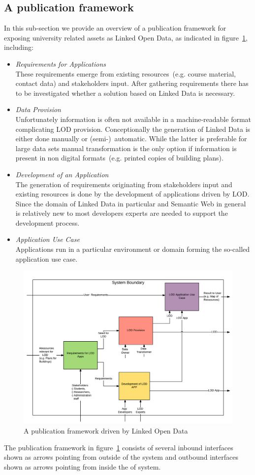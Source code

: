 \documentclass{article}
\begin{document}
\subsection{A publication framework}
\label{sec:publication_framework}
In this sub-section we provide an overview of a publication framework for exposing university related assets as Linked Open Data, as indicated in figure~\ref{fig:lod-architecture}, including:
\begin{itemize}
  \item \textit{Requirements for Applications}~\\
  These requirements emerge from existing resources~(e.g. course material, contact data) and stakeholders input. After gathering requirements there has to be investigated whether a solution based on Linked Data is necessary.
  \item \textit{Data Provision}~\\
  Unfortunately information is often not available in a machine-readable format complicating LOD provision. Conceptionally the generation of Linked Data is either done manually or (semi-)~automatic. While the latter is preferable for large data sets manual transformation is the only option if information is present in non digital formats~(e.g. printed copies of building plans).  
  \item \textit{Development of an Application}~\\
  The generation of requirements originating from stakeholders input and existing resources is done by the development of applications driven by LOD. Since the domain of Linked Data in particular and Semantic Web in general is relatively new to most developers experts are needed to support the development process. 
  \item \textit{Application Use Case}~\\
  Applications run in a particular environment or domain forming the so-called application use case. 
\end{itemize}

\begin{figure}[H]
	\centering \includegraphics*[width=.8\columnwidth]{lod_architecture.png}
	\caption{A publication framework driven by Linked Open Data}
	\label{fig:lod-architecture}
\end{figure}
The publication framework in figure~\ref{fig:lod-architecture} consists of several inbound interfaces shown as arrows pointing from outside of the system and outbound interfaces shown as arrows pointing from inside the of system.
\end{document}

